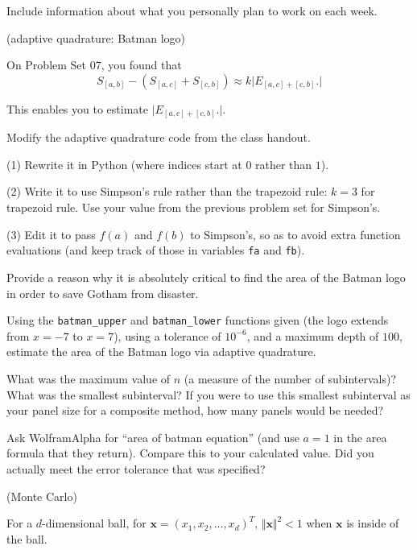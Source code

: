 \documentclass[12pt,letterpaper,noanswers]{exam}
\newcommand{\vc}[1]{\boldsymbol{#1}}
\begin{document}
\begin{questions}
Include information about what you personally plan to work on each week.  

\item (adaptive quadrature: Batman logo)

On Problem Set 07, you found that \[S_{[a,b]}-\left(S_{[a,c]}+S_{[c,b]}\right) \approx k\vert E_{[a,c]+[c,b]}.\vert\]

This enables you to estimate $\vert E_{[a,c]+[c,b]}.\vert$.

\begin{parts}
\item Modify the adaptive quadrature code from the class handout.  

(1) Rewrite it in Python (where indices start at $0$ rather than $1$).  

(2) Write it to use Simpson's rule rather than the trapezoid rule: $k=3$ for trapezoid rule.  Use your value from the previous problem set for Simpson's.  

(3) Edit it to pass $f(a)$ and $f(b)$ to Simpson's, so as to avoid extra function evaluations (and keep track of those in variables \texttt{fa} and \texttt{fb}).

\item Provide a reason why it is absolutely critical to find the area of the Batman logo in order to save Gotham from disaster.

Using the \texttt{batman\_upper} and \texttt{batman\_lower} functions given (the logo extends from $x=-7$ to $x=7$), using a tolerance of $10^{-6}$, and a maximum depth of $100$, estimate the area of the Batman logo via adaptive quadrature.

\item What was the maximum value of $n$ (a measure of the number of subintervals)?  What was the smallest subinterval?  If you were to use this smallest subinterval as your panel size for a composite method, how many panels would be needed?

\item Ask WolframAlpha for ``area of batman equation'' (and use $a=1$ in the area formula that they return).  Compare this to your calculated value.  Did you actually meet the error tolerance that was specified?
\end{parts}

\item (Monte Carlo)

For a $d$-dimensional ball, for $\vc{x} = (x_1, x_2, ..., x_d)^T$, $\Vert\vc{x}\Vert^2 < 1$ when $\vc{x}$ is inside of the ball.




\end{questions}
\end{document}
